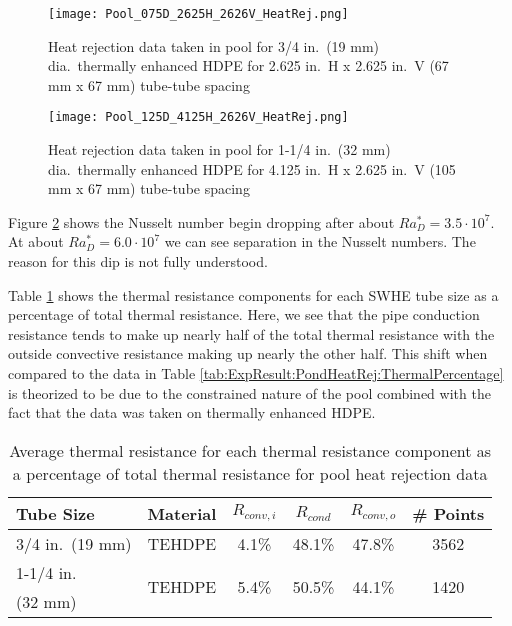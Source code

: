 		\begin{figure}
		\centering
		\texttt{[image: Pool\_075D\_2625H\_2626V\_HeatRej.png]}
		\caption[Heat rejection data taken in pool on July 7, 2012]{Heat rejection data taken in pool for 3/4 in.\ (19 mm) dia.\ thermally enhanced HDPE for 2.625 in.\ H x 2.625 in.\ V (67 mm x 67 mm) tube-tube spacing}
		\label{fig:ExpResult:HeatRej:PoolData:Pool_075D_2625H_2626V_HeatRej}
	\end{figure}	
	
		\begin{figure}
		\centering
		\texttt{[image: Pool\_125D\_4125H\_2626V\_HeatRej.png]}
		\caption[Heat rejection data taken in pool on Oct 24, 2012]{Heat rejection data taken in pool for 1-1/4 in.\ (32 mm) dia.\ thermally enhanced HDPE for 4.125 in.\ H x 2.625 in.\ V (105 mm x 67 mm) tube-tube spacing}
		\label{fig:ExpResult:HeatRej:PoolData:Pool_125D_4125H_2626V_HeatRej}
	\end{figure}
	
Figure \ref{fig:ExpResult:HeatRej:PoolData:Pool_125D_4125H_2626V_HeatRej} shows the Nusselt number begin dropping after about $Ra_D^*=3.5\cdot10^7$. At about $Ra_D^*=6.0\cdot10^7$ we can see separation in the Nusselt numbers. The reason for this dip is not fully understood.

Table \ref{tab:ExpResult:PoolHeatRej:ThermalPercentage} shows the thermal resistance components for each SWHE tube size as a percentage of total thermal resistance. Here, we see that the pipe conduction resistance tends to make up nearly half of the total thermal resistance with the outside convective resistance making up nearly the other half. This shift when compared to the data in Table \ref{tab:ExpResult:PondHeatRej:ThermalPercentage} is theorized to be due to the constrained nature of the pool combined with the fact that the data was taken on thermally enhanced HDPE.

	\begin{table}[h]
		\centering
		\caption[Average thermal resistance percentages for pool heat rejection data]{Average thermal resistance for each thermal resistance component as a percentage of total thermal resistance for pool heat rejection data}
		\label{tab:ExpResult:PoolHeatRej:ThermalPercentage}
		\begin{tabular}{p{3cm} c c c c c}
		\hline
		Tube Size & Material & $R_{conv,i}$ & $R_{cond}$ & $R_{conv,o}$ & \# Points\\
		\hline\hline
		3/4 in.\ (19 mm) & TEHDPE & 4.1\% & 48.1\% & 47.8\% & 3562 \\
		\hline
		1-1/4 in.\ & \multirow{2}{*}{TEHDPE} & \multirow{2}{*}{5.4\%} & \multirow{2}{*}{50.5\%} & \multirow{2}{*}{44.1\%} & \multirow{2}{*}{1420} \\
		(32 mm) & & & & \\
		\hline	
		\end{tabular}
	\end{table}	

